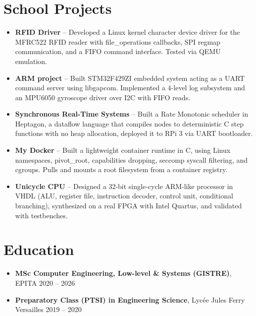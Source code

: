 \documentclass[9pt,a4paper]{article}
\begin{document}
\section*{School Projects}
\begin{tcolorbox}[mybox]
\begin{itemize}
\item \textbf{RFID Driver} -- Developed a Linux kernel character device driver for the MFRC522 RFID reader with file\_operations callbacks, SPI regmap communication, and a FIFO command interface. Tested via QEMU emulation.

\item \textbf{ARM project} -- Built STM32F429ZI embedded system acting as a UART command server using libgapcom. Implemented a 4-level log subsystem and an MPU6050 gyroscope driver over I2C with FIFO reads.

\item \textbf{Synchronous Real-Time Systems} -- Built a Rate Monotonic scheduler in Heptagon, a dataflow language that compiles nodes to deterministic C step functions with no heap allocation, deployed it to RPi 3 via UART bootloader.

\item \textbf{My Docker} -- Built a lightweight container runtime in C, using Linux namespaces, pivot\_root, capabilities dropping, seccomp syscall filtering, and cgroups. Pulls and mounts a root filesystem from a container registry.

\item \textbf{Unicycle CPU} -- Designed a 32-bit single-cycle ARM-like processor in VHDL (ALU, register file, instruction decoder, control unit, conditional branching), synthesized on a real FPGA with Intel Quartus, and validated with testbenches.
\end{itemize}
\end{tcolorbox}


\section*{Education}
\begin{tcolorbox}[mybox]
\begin{itemize}
\item \textbf{MSc Computer Engineering, Low-level \& Systems (GISTRE)}, EPITA {\small{\hfill 2020 – 2026}}

\item \textbf{Preparatory Class (PTSI) in Engineering Science}, Lycée Jules Ferry Versailles {\small{\hfill 2019 – 2020}}
\end{itemize}
\end{tcolorbox}
\end{document}
